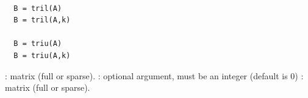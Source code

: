 \begin{mandesc}
  \\
\end{mandesc}
\begin{calling_sequence}
\begin{verbatim}
  B = tril(A)
  B = tril(A,k)
  
  B = triu(A)
  B = triu(A,k)
\end{verbatim}
\end{calling_sequence}
\begin{parameters}
  \begin{varlist}
    : matrix (full or sparse).
    : optional argument, must be an integer (default is $0$)
    : matrix (full or sparse).
  \end{varlist}
\end{parameters}
